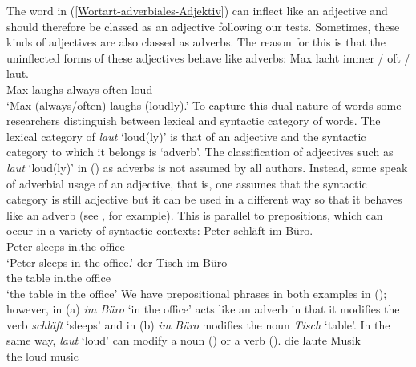 The word in (\ref{Wortart-adverbiales-Adjektiv}) can inflect like an adjective and should therefore be classed as an adjective following our tests. Sometimes, these
kinds of adjectives are also classed as adverbs. The reason for this is that the uninflected forms of these adjectives behave like adverbs:
\ea
\gll Max lacht  immer  /  oft   / laut.\\
     Max laughs always {} often {} loud\\
\glt `Max (always/often) laughs (loudly).'
\z
%
To capture this dual nature of words some researchers distinguish between lexical and syntactic
category of words. The lexical category of \emph{laut} `loud(ly)' is that of an adjective and the syntactic category to which it belongs is
`adverb'. The classification of adjectives such as \emph{laut} `loud(ly)' in () as adverbs is not assumed by all authors.
Instead, some speak of adverbial usage of an adjective, that is, one assumes that the syntactic category is still adjective but
it can be used in a different way so that it behaves like an adverb (see \citealp[Section~7.3]{Eisenberg2004a}, for example). This
is parallel to prepositions, which can occur in a variety of syntactic contexts:
\eal
\ex 
\gll Peter schläft im Büro.\\
     Peter sleeps in.the office\\
\glt `Peter sleeps in the office.'
\ex 
\gll der Tisch im Büro\\
     the table in.the office\\
\glt `the table in the office'
\zl
We have prepositional phrases in both examples in (); however, in (a) \emph{im Büro} `in the office' acts like an adverb in that it modifies the verb 
\emph{schläft} `sleeps' and in (b) \emph{im Büro} modifies the noun \emph{Tisch} `table'. In the same way, \emph{laut} `loud' can modify a noun () or
a verb ().
\ea
\gll die laute Musik\\
     the loud music\\
\z 

